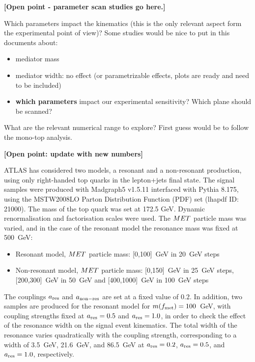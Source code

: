 
\textbf{[Open point - parameter scan studies go here.]}

 Which parameters impact the kinematics (this is the only relevant aspect form the experimental point of view)? 
 Some studies would be nice to put in this documents about:
 \begin{itemize}
  \item mediator mass
  \item mediator width: no effect (or parametrizable effects, plots are ready and need to be included)
  \item \textbf{which parameters} impact our experimental sensitivity? Which plane should be scanned?
 \end{itemize}

 What are the relevant numerical range to explore? First guess would be to follow the mono-top analysis.


\textbf{[Open point: update with new numbers]}

ATLAS has considered two models, a resonant and a non-resonant production, using only right-handed top quarks in the lepton+jets final state. The signal samples were produced with {\sc Madgraph5} v1.5.11 interfaced with {\sc Pythia} 8.175, using the MSTW2008LO Parton Distribution Function (PDF) set (lhapdf ID: 21000).
The mass of the top quark was set at 172.5 GeV. Dynamic renormalisation and factorisation scales were used.
The $MET$ particle mass was varied, and in the case of the resonant model the resonance mass was fixed at 500~GeV:
\begin{itemize}
\item Resonant model,  $MET$ particle mass: [0,100]~GeV in 20~GeV steps
\item Non-resonant model, $MET$ particle mass: [0,150]~GeV in 25~GeV steps, [200,300]~GeV in 50~GeV and [400,1000]~GeV in 100~GeV steps 
\end{itemize}

The couplings $a_{\mathrm{res}}$ and $a_{\mathrm{non-res}}$ are set at a fixed value of $0.2$.
In addition, two samples are produced for the resonant model for $m(f_{\mathrm{met}})=100$~GeV,
with coupling strengths fixed at $a_{\mathrm{res}}=0.5$ and $a_{\mathrm{res}}=1.0$,
in order to check the effect of the resonance width on the signal event kinematics. 
The total width of the resonance varies quadratically with the coupling strength,
corresponding to a width of 3.5~GeV, 21.6~GeV, and 86.5~GeV at $a_{\mathrm{res}}=0.2$, $a_{\mathrm{res}}=0.5$, and $a_{\mathrm{res}}=1.0$, respectively.

